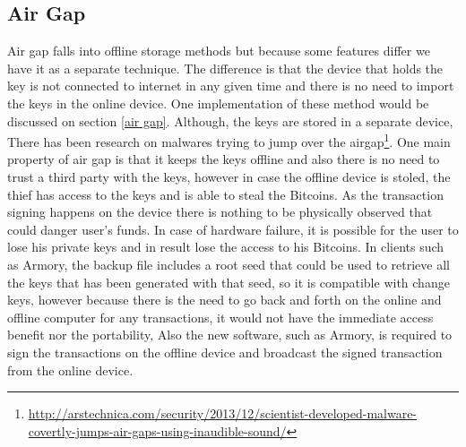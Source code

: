 
\subsection{Air Gap}
Air gap falls into offline storage methods but because some features differ we have it as a separate technique. The difference is that the device that holds the key is not connected to internet in any given time and there is no need to import the keys in the online device. One implementation of these method would be discussed on section \ref{air gap}. 
Although, the keys are stored in a separate device, There has been research on malwares trying to jump over the airgap\footnote{\url{http://arstechnica.com/security/2013/12/scientist-developed-malware-covertly-jumps-air-gaps-using-inaudible-sound/}}. One main property of air gap is that it keeps the keys offline and also there is no need to trust a third party with the keys, however in case the offline device is stoled, the thief has access to the keys and is able to steal the Bitcoins. %
As the transaction signing happens on the device there is nothing to be physically observed that could danger user's funds. In case of hardware failure, it is possible for the user to lose his private keys and in result lose the access to his Bitcoins. %
In clients such as Armory, the backup file includes a root seed that could be used to retrieve all the keys that has been generated with that seed, so it is compatible with change keys, however because there is the need to go back and forth on the online and offline computer for any transactions, it would not have the immediate access benefit nor the portability, Also the new software, such as Armory, is required to sign the transactions on the offline device and broadcast the signed transaction from the online device.





